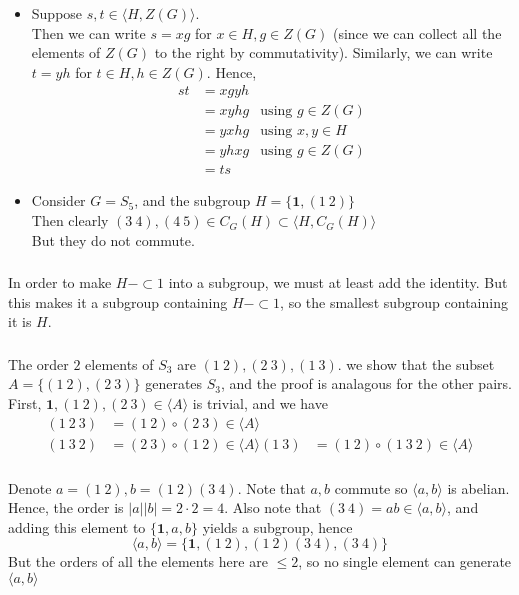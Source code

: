 \documentclass{article}
\newcommand{\set}[1]{ \{ #1 \} }
\newcommand{\id}{ \bm{1} }
\newcommand{\comp}{ \circ }
\newcommand{\cyclic}[1]{\langle#1\rangle}
\begin{document}
\subsubsection{}\label{ex4p3}

\begin{itemize}
\item
Suppose $s,t \in \cyclic{H,Z(G)}$.\\
Then we can write $s=xg$ for $x\in H, g\in Z(G)$ (since we can collect all the elements of $Z(G)$ to the right by commutativity). Similarly, we can write $t=yh$ for $t\in H, h\in Z(G)$. Hence,
\begin{align*}
st &= xgyh\\
&= xyhg & \mbox{using $g\in Z(G)$}\\
&= yxhg & \mbox{using $x,y\in H$}\\
&= yhxg & \mbox{using $g\in Z(G)$}\\
&= ts
\end{align*}
\item
Consider $G= S_5$, and the subgroup $H=\set{\id, (1\ 2)}$\\
Then clearly $(3\ 4), (4\ 5) \in C_G(H) \subset \cyclic{H,C_G(H)}$\\
But they do not commute.
\end{itemize}
\subsubsection{}\label{ex4p4}
In order to make $H-\subset{1}$ into a subgroup, we must at least add the identity. But this makes it a subgroup containing $H-\subset{1}$, so the smallest subgroup containing it is $H$.
\subsubsection{}\label{ex4p5}
The order $2$ elements of $S_3$ are $(1\ 2),(2\ 3),(1\ 3)$. we show that the subset $A=\set{(1\ 2), (2\ 3)}$ generates $S_3$, and the proof is analagous for the other pairs.\\
First, $\id, (1\ 2), (2\ 3) \in \cyclic{A}$ is trivial, and we have\\
\begin{align*}
(1\ 2\ 3) &= (1\ 2)\comp (2\ 3) \in \cyclic{A}\\
(1\ 3\ 2) &= (2\ 3)\comp (1\ 2) \in \cyclic{A}
(1\ 3) &= (1\ 2) \comp (1\ 3\ 2) \in \cyclic{A}
\end{align*}
\subsubsection{}\label{ex4p6}
Denote $a=(1\ 2), b=(1\ 2)(3\ 4)$. Note that $a,b$ commute so $\cyclic{a,b}$ is abelian. Hence, the order is $|a||b| = 2\cdot 2 = 4$. Also note that $(3\ 4) = ab \in \cyclic{a,b}$, and adding this element to $\set{\id,a,b}$ yields a subgroup, hence
\begin{equation}
\cyclic{a,b} = \set{\id,(1\ 2),(1\ 2)(3\ 4),(3\ 4)}
\end{equation}
But the orders of all the elements here are $\leq 2$, so no single element can generate $\cyclic{a,b}$
\end{document}
